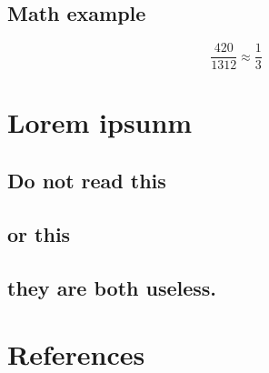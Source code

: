 \documentclass[12pt]{article}%
\begin{document}
\subsection{Math example}
\begin{equation}
\frac{420}{1312}\approx \frac13
\end{equation}

\section{Lorem ipsunm}
\subsection{Do not read this}
\lipsum[1]

\subsection{or this}
\lipsum[1]

\subsection{they are both useless.}
\lipsum[1]

\section{References}
\printbibliography[title= \vspace{-1.5cm}]

\end{document}

